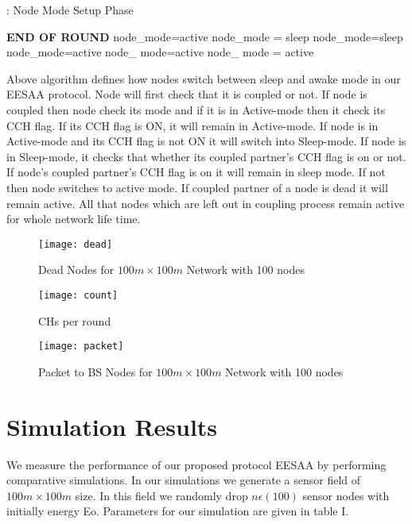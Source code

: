 \documentclass[journal]{IEEEtran}
\begin{document}
\begin{algorithm}[H]
\caption{: Node Mode Setup Phase}
\begin{algorithmic}[1]
\STATE \textbf{END OF ROUND}
                \STATE node\_mode=active
                \STATE node\_mode = sleep
                \STATE node\_mode=sleep
                \STATE node\_mode=active
         \ENDIF
               \STATE node\_ mode=active
     \ELSE
                \STATE node\_ mode = active
   \ENDIF
\end{algorithmic}
\end{algorithm}

 Above algorithm defines how nodes switch between sleep and awake mode in our EESAA protocol. Node will first check that it is coupled or not. If node is coupled then node check its mode and if it is in Active-mode then it check its CCH flag. If its CCH flag is ON, it will remain in Active-mode. If node is in Active-mode and its CCH flag is not ON it will switch into Sleep-mode. If node is in Sleep-mode, it checks that whether its coupled partner's CCH flag is on or not. If node's coupled partner's CCH flag is on it will remain in sleep mode. If not then node switches to active mode. If coupled partner of a node is dead it will remain active. All that nodes which are left out in coupling process remain active for whole network life time.

 \begin{figure*}[t]
\centering
  \texttt{[image: dead]}
  \caption{Dead Nodes for $100m\times100m$ Network with 100 nodes}\label{abc}
\end{figure*}

\begin{figure*}[t]
\centering
  \texttt{[image: count]}
  \caption{CHs per round}\label{abc}
\end{figure*}

\begin{figure*}[t]
\centering
  \texttt{[image: packet]}
  \caption{Packet to BS Nodes for $100m\times100m$ Network with 100 nodes}\label{abc}
\end{figure*}

 \section{Simulation Results}
 We measure the performance of our proposed protocol EESAA by performing comparative simulations. In our simulations we generate a sensor field of $100m\times100m$ size. In this field we randomly drop $n \epsilon (100)$ sensor nodes with initially energy Eo. Parameters for our simulation are given in table I.
\end{document}
